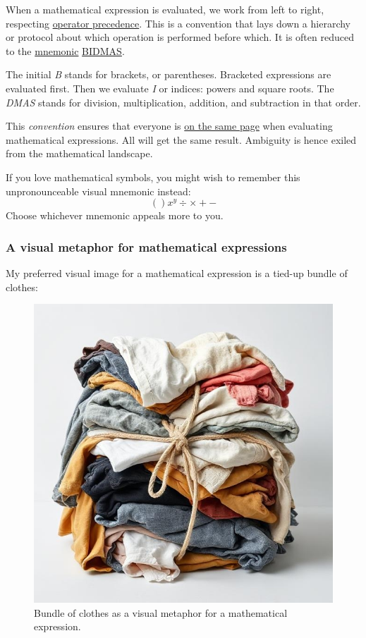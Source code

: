 \documentclass[
  a4paper,
]{article}
\begin{document}
When a mathematical expression is evaluated, we work from left to right,
respecting
\href{https://en.wikipedia.org/wiki/Order_of_operations}{operator
precedence}. This is a convention that lays down a hierarchy or protocol
about which operation is performed before which. It is often reduced to
the \href{https://www.dictionary.com/browse/mnemonic}{mnemonic}
\href{https://en.wikipedia.org/wiki/Order_of_operations\#Mnemonics}{BIDMAS}.

The initial \emph{B} stands for brackets, or parentheses. Bracketed
expressions are evaluated first. Then we evaluate \emph{I} or indices:
powers and square roots. The \emph{DMAS} stands for division,
multiplication, addition, and subtraction in that order.

This \emph{convention} ensures that everyone is
\href{https://www.gingersoftware.com/content/phrases/on-the-same-page}{on
the same page} when evaluating mathematical expressions. All will get
the same result. Ambiguity is hence exiled from the mathematical
landscape.

If you love mathematical symbols, you might wish to remember this
unpronounceable visual mnemonic instead: \[
()x^y\div\times+-
\] Choose whichever mnemonic appeals more to you.

\subsubsection{A visual metaphor for mathematical
expressions}\label{a-visual-metaphor-for-mathematical-expressions}

My preferred visual image for a mathematical expression is a tied-up
bundle of clothes:

\begin{figure}
\centering
\includegraphics[width=0.8\linewidth,height=\textheight,keepaspectratio]{images/bundle-of-clothes-in-disarray.jpg}
\caption{Bundle of clothes as a visual metaphor for a mathematical
expression.}\label{fig:clothes-bundle}
\end{figure}
\end{document}
